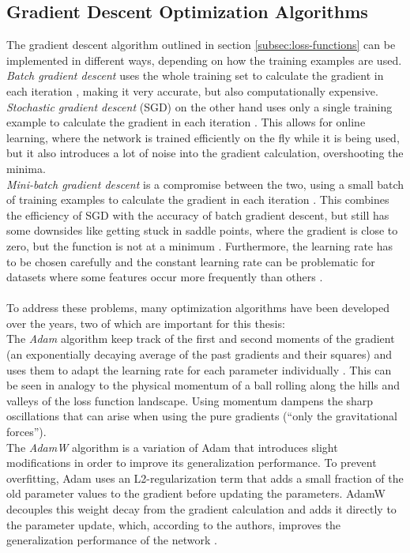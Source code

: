 \subsection{Gradient Descent Optimization Algorithms}
\label{subsec:sgd}
The gradient descent algorithm outlined in section \ref{subsec:loss-functions} can be implemented in different ways, depending on how the training examples are used. 
\\
\textit{Batch gradient descent} uses the whole training set to calculate the gradient in each iteration \cite{ruder_overview_2017}, making it very accurate, but also computationally expensive. \textit{Stochastic gradient descent} (SGD) on the other hand uses only a single training example to calculate the gradient in each iteration \cite{ruder_overview_2017}. This allows for online learning, where the network is trained efficiently on the fly while it is being used, but it also introduces a lot of noise into the gradient calculation, overshooting the minima. 
\\
\textit{Mini-batch gradient descent} is a compromise between the two, using a small batch of training examples to calculate the gradient in each iteration \cite{ruder_overview_2017}. This combines the efficiency of SGD with the accuracy of batch gradient descent, but still has some downsides like getting stuck in saddle points, where the gradient is close to zero, but the function is not at a minimum \cite{ruder_overview_2017}. Furthermore, the learning rate has to be chosen carefully and the constant learning rate can be problematic for datasets where some features occur more frequently than others \cite{ruder_overview_2017}.
\\
\\
To address these problems, many optimization algorithms have been developed over the years, two of which are important for this thesis:
\\
The \textit{Adam} algorithm \cite{kingma_adam_2017} keep track of the first and second moments of the gradient (an exponentially decaying average of the past gradients and their squares) and uses them to adapt the learning rate for each parameter individually \cite{kingma_adam_2017,ruder_overview_2017}. This can be seen in analogy to the physical momentum of a ball rolling along the hills and valleys of the loss function landscape. Using momentum dampens the sharp oscillations that can arise when using the pure gradients (\enquote{only the gravitational forces}).
\\
The \textit{AdamW} algorithm \cite{loshchilov_decoupled_2019} is a variation of Adam that introduces slight modifications in order to improve its generalization performance. To prevent overfitting, Adam uses an L2-regularization term that adds a small fraction of the old parameter values to the gradient before updating the parameters. AdamW decouples this weight decay from the gradient calculation and adds it directly to the parameter update, which, according to the authors, improves the generalization performance of the network \cite{loshchilov_decoupled_2019}.


